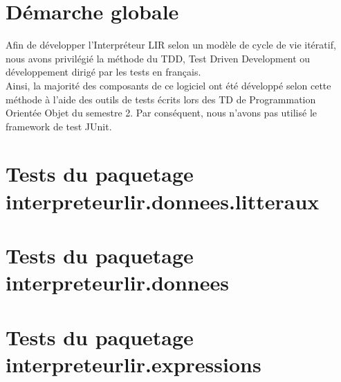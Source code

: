 \large
\chapter*{Démarche globale}
Afin de développer l'Interpréteur LIR selon un modèle de cycle de vie
itératif, nous avons privilégié la méthode du TDD, Test Driven Development ou
développement dirigé par les tests en français.
\\Ainsi, la majorité des composants de ce logiciel ont été développé selon
cette méthode à l'aide des outils de tests écrits lors des TD de Programmation
Orientée Objet du semestre 2. Par conséquent, nous n'avons pas utilisé le
framework de test JUnit.

\chapter{Tests du paquetage interpreteurlir.donnees.litteraux}


\chapter{Tests du paquetage interpreteurlir.donnees}


\chapter{Tests du paquetage interpreteurlir.expressions}
